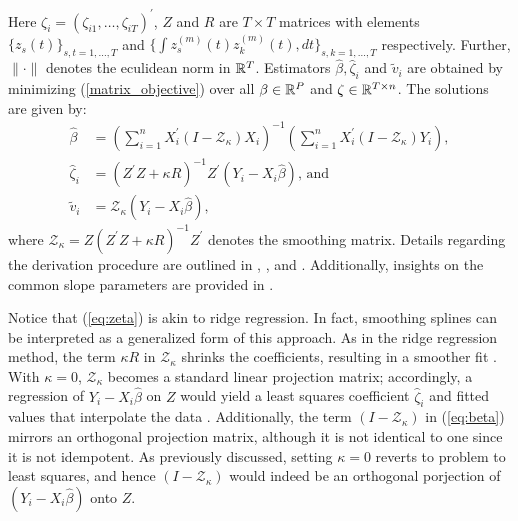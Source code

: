 Here $\zeta_i = (\zeta_{i1}, \ldots, \zeta_{iT})^\prime$, $Z$ and $R$ are $T \times T$ matrices with elements $\{z_s(t)\}_{s,t = 1, \ldots, T}$ and $\{\int z_s^{(m)}(t)z_k^{(m)}(t), dt\}_{s,k=1, \ldots, T}$ respectively. Further, $\| \cdot\|$ denotes the eculidean norm in $\mathbb{R}^T$.   Estimators $\hat{\beta}, \hat{\zeta}_i$ and $\tilde{v}_i$ are obtained by minimizing (\ref{matrix_objective}) over all $\beta \in \mathbb{R}^P$ and $\zeta \in \mathbb{R}^{T \times n}$. The solutions are given by:
\begin{align}
    \hat{\beta} &= \left(\sum_{i=1}^n X_i^{\prime}\left(I-\mathcal{Z}_\kappa\right)X_i\right)^{-1}\left(\sum_{i=1}^n X_i^{\prime}\left(I-\mathcal{Z}_\kappa\right) Y_i\right), \label{eq:beta} \\
    \hat{\zeta}_i &= \left(Z^{\prime} Z+\kappa R\right)^{-1} Z^{\prime}\left(Y_i-X_i \hat{\beta}\right), \, \text{and}\label{eq:zeta} \\
    \tilde{v}_i &= \mathcal{Z}_\kappa\left(Y_i-X_i \hat{\beta}\right) \label{eq:v},
\end{align}
where $\mathcal{Z}_\kappa=Z\left(Z^{\prime} Z+\kappa R\right)^{-1} Z^{\prime}$ denotes the smoothing matrix. Details regarding the derivation procedure are outlined in \citet{eubank1999nonparametric}, \citet{wasserman2006all}, and \citet{shalizi2016advanced}. Additionally, insights on the common slope parameters are provided in \citet{hardle2000partially}.

Notice that (\ref{eq:zeta}) is akin to ridge regression. In fact, smoothing splines can be interpreted as a generalized form of this approach. As in the ridge regression method, the term $\kappa R$ in $\mathcal{Z}_\kappa$ shrinks the coefficients, resulting in a smoother fit \citep{eubank1999nonparametric, hastie2009elements}. With $\kappa = 0$, $\mathcal{Z}_\kappa$ becomes a standard linear projection matrix; accordingly, a regression of $Y_i - X_i\hat{\beta}$ on $Z$ would yield a least squares coefficient $\hat{\zeta}_i$ and fitted values that interpolate the data \citep{wasserman2006all}. Additionally, the term $( I - \mathcal{Z}_\kappa)$ in (\ref{eq:beta}) mirrors an orthogonal projection matrix, although it is not identical to one since it is not idempotent. As previously discussed, setting $\kappa = 0$ reverts to problem to least squares, and hence $( I - \mathcal{Z}_\kappa)$ would indeed be an orthogonal porjection of  $(Y_i - X_i\hat{\beta})$ onto $Z$. 



